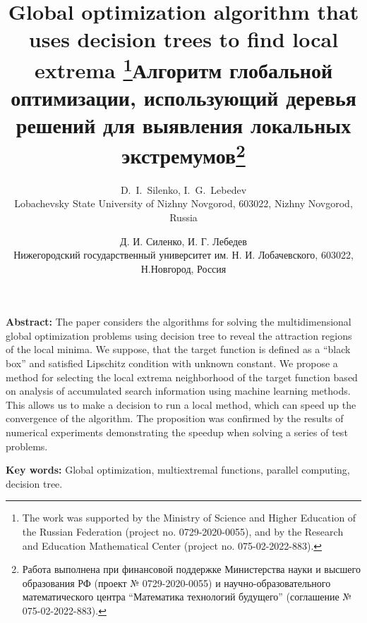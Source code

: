 \documentclass[12pt, a4paper, russian]{article}
\begin{document}

\title{Global optimization algorithm that uses decision trees to find local extrema \thanks{The work was supported by the Ministry of Science and Higher Education of the Russian Federation (project no. 0729-2020-0055), and by the Research and Education Mathematical Center (project no.  075-02-2022-883).}}

\author{D.~I.~Silenko, I.~G.~Lebedev\\
	\small{Lobachevsky State University of Nizhny Novgorod, 603022, Nizhny Novgorod, Russia}
}
\date{}
\maketitle

\begin{small}
\textbf{Abstract:} The paper considers the algorithms for solving the multidimensional global optimization problems using decision tree to reveal the attraction regions of the local minima. We suppose, that the target function is defined as a “black box” and satisfied Lipschitz condition with unknown constant. We propose a method for selecting the local extrema neighborhood of the target function based on analysis of accumulated search information using machine learning methods. This allows us to make a decision to run a local method, which can speed up the convergence of the algorithm. The proposition was confirmed by the results of numerical experiments demonstrating the speedup when solving a series of test problems.

\textbf{Key words:} Global optimization, multiextremal functions, parallel computing, decision tree.
\end{small}

\renewcommand{\refname}{References}





\emptythanks
\title{Алгоритм глобальной оптимизации, использующий деревья решений для выявления локальных экстремумов\thanks{Работа выполнена при финансовой поддержке Министерства науки и высшего образования РФ (проект № 0729-2020-0055) и научно-образовательного математического центра “Математика технологий будущего” (соглашение № 075-02-2022-883).}}

\author{Д. И. Силенко, И. Г. Лебедев\\
	\small{Нижегородский государственный университет им. Н. И. Лобачевского, 603022, Н.Новгород, Россия} 
}
\date{}
\maketitle
\end{document}
